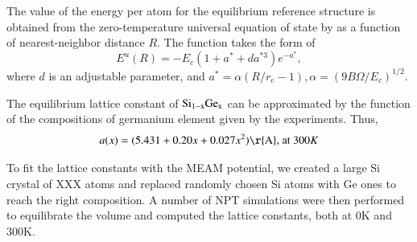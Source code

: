 \documentclass[review]{elsarticle}
\begin{document}
The value of the energy per atom for the equilibrium reference structure is obtained from the zero-temperature universal equation of state by \cite{rose1984universal} as a function of nearest-neighbor distance $R$. The function takes the form of
\begin{equation}
E^u (R) = -E_c (1+a^* + da^{*3})e^{-a^*},
\end{equation}
where $d$ is an adjustable parameter, and $a^* = \alpha (R/r_e -1 ), \alpha = (9B\Omega/E_c)^{1/2}$.

The equilibrium lattice constant of $\rm Si_{1-x}Ge_x$ can be approximated by the function of the compositions of germanium element given by the experiments. Thus,
\begin{equation*}\label{eq:analy_lattice}
a(x) = ( 5.431 + 0.20x + 0.027x^2) {\rm \r{ A}} \text{, at } 300 K
\end{equation*}

To fit the lattice constants with the MEAM potential, we created a large Si crystal of {\color{red}XXX} atoms and replaced randomly chosen Si atoms with Ge ones to reach the right composition. A number of NPT simulations were then performed to equilibrate the volume and computed the lattice constants, both at $0$K and $300$K. 
\end{document}
